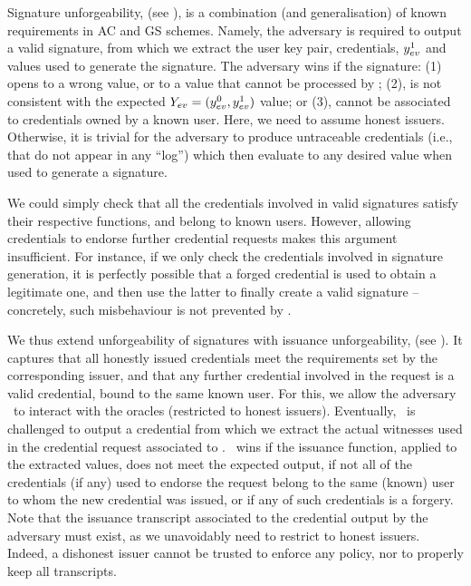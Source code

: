 Signature unforgeability, \ExpForgeSign (see ),
is a combination (and
generalisation) of known requirements in AC and GS schemes. Namely, the
adversary is required to output a valid signature, from which we extract the
user key pair, credentials, $y_{ev}^1$ and \yinsp values used to generate the
signature. The adversary wins if the signature: (1) opens to a wrong value, or
to a value that cannot be processed by \Judge; (2), is not consistent with the
expected $Y_{ev} = (y_{ev}^0,y_{ev}^1)$ value; or (3), cannot be associated to
credentials owned by a known user. Here, we need to assume honest issuers.
Otherwise, it is trivial for the adversary to produce untraceable credentials
(i.e., that do not appear in any ``log'') which then evaluate to any desired
value when used to generate a signature.

We could simply check that all the credentials involved in valid signatures
satisfy their respective \fissue functions, and belong to known users. However,
allowing credentials to endorse further credential requests makes this argument
insufficient. For instance, if we only check the credentials involved in
signature generation, it is perfectly possible that a forged credential is used
to obtain a legitimate one, and then use the latter to finally create a valid
signature -- concretely, such misbehaviour is not prevented by \ExpForgeSign. 

We thus extend unforgeability of signatures with issuance unforgeability,
\ExpForgeIssue (see ). It captures that all honestly
issued credentials meet the requirements set by the corresponding issuer, and
that any further credential
involved in the request is a valid credential, bound to the same known user. For
this, we allow the adversary \adv~to interact with the oracles (restricted to
honest issuers). Eventually, \adv~is challenged to output a credential \Cred
from which we extract the actual witnesses used in the credential request
associated to \cid. \adv~wins if the issuance function, applied to the extracted
values, does not meet the expected output, if not all of the credentials (if
any) used to endorse the request belong to the same (known) user to whom the new
credential was issued, or if any of such credentials is a forgery. Note that the
issuance transcript associated to the credential output by the adversary must
exist, as we unavoidably need to restrict to honest issuers. Indeed, a dishonest
issuer cannot be trusted to enforce any policy, nor to properly keep all
transcripts.

